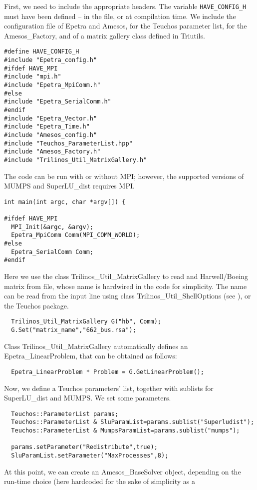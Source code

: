 \documentclass[11pt,letter]{article}
\begin{document}
First, we need to include the appropriate headers. The variable
\verb!HAVE_CONFIG_H! must have been defined -- in the file, or at
compilation time. We include the configuration file of Epetra and
Amesos, for the Teuchos parameter list, for the Amesos\_Factory, and of
a matrix gallery class defined in Triutils.
\begin{verbatim}
#define HAVE_CONFIG_H
#include "Epetra_config.h"
#ifdef HAVE_MPI
#include "mpi.h"
#include "Epetra_MpiComm.h"
#else
#include "Epetra_SerialComm.h"
#endif
#include "Epetra_Vector.h"
#include "Epetra_Time.h"
#include "Amesos_config.h"
#include "Teuchos_ParameterList.hpp"
#include "Amesos_Factory.h"
#include "Trilinos_Util_MatrixGallery.h"
\end{verbatim}
The code can be run with or without MPI; however, the supported versions
of MUMPS and SuperLU\_dist requires MPI.
\begin{verbatim}
int main(int argc, char *argv[]) {

#ifdef HAVE_MPI
  MPI_Init(&argc, &argv);
  Epetra_MpiComm Comm(MPI_COMM_WORLD);
#else
  Epetra_SerialComm Comm;
#endif
\end{verbatim}
Here we use the class Trilinos\_Util\_MatrixGallery to read and
Harwell/Boeing matrix from file, whose name is hardwired in the code for
simplicity. The name can be read from the input line using class
Trilinos\_Util\_ShellOptions (see \cite{Trilinos-tutorial}), or the
Teuchos package.
\begin{verbatim}
  Trilinos_Util_MatrixGallery G("hb", Comm);
  G.Set("matrix_name","662_bus.rsa");
\end{verbatim}
Class Trilinos\_Util\_MatrixGallery automatically defines an
Epetra\_LinearProblem, that can be obtained as follows:
\begin{verbatim}  
  Epetra_LinearProblem * Problem = G.GetLinearProblem();
\end{verbatim}
Now, we define a Teuchos parameters' list, together with sublists for
SuperLU\_dist and MUMPS. We set some parameters.
\begin{verbatim}  
  Teuchos::ParameterList params;
  Teuchos::ParameterList & SluParamList=params.sublist("Superludist");
  Teuchos::ParameterList & MumpsParamList=params.sublist("mumps");

  params.setParameter("Redistribute",true);
  SluParamList.setParameter("MaxProcesses",8);
\end{verbatim}
At this point, we can create an Amesos\_BaseSolver object, depending on
the run-time choice (here hardcoded for the sake of simplicity as a
\end{document}
